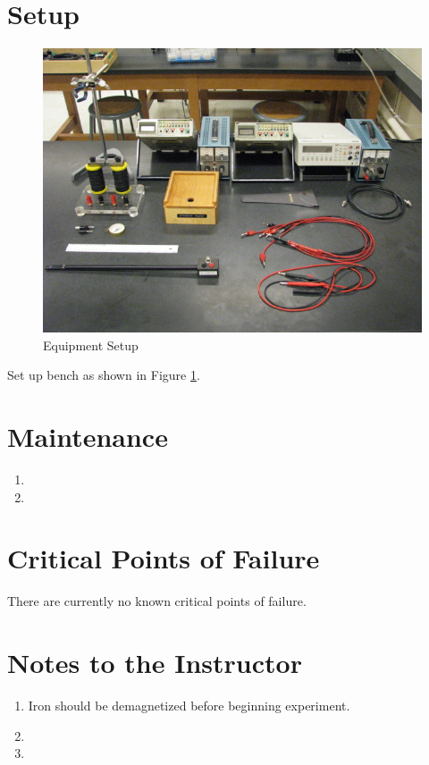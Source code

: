 \section{Setup}
\begin{figure}[!ht]
  \center
  \includegraphics{Hall-Effect-and-Magnetic-Hysteresis-Setup.jpg}
  \caption{Equipment Setup}
  \label{pic:HMSetup}
\end{figure}
Set up bench as shown in Figure \ref{pic:HMSetup}.


\section{Maintenance}
\begin{enumerate}
\item 
\item 
\end{enumerate}


\section{Critical Points of Failure}
There are currently no known critical points of failure.


\section{Notes to the Instructor}
\begin{enumerate}
\item Iron should be demagnetized before beginning experiment.
\item 
\item 
\end{enumerate}


